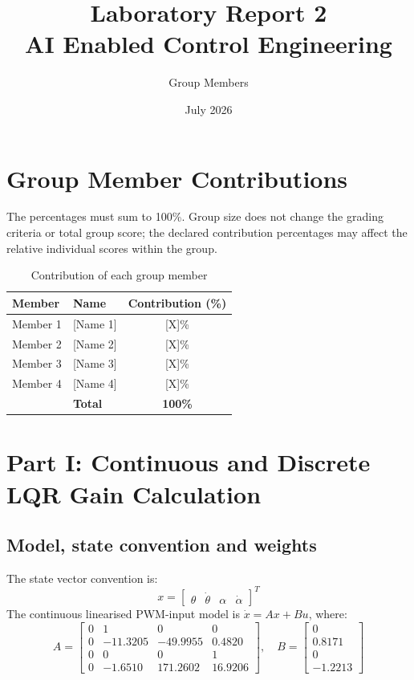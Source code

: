\documentclass[12pt,a4paper]{article}
\title{\textbf{Laboratory Report 2\\AI Enabled Control Engineering}}
\author{Group Members}
\date{July 2026}
\begin{document}
\maketitle

\section*{Group Member Contributions}
The percentages must sum to 100\%. Group size does not change the grading criteria or total group score; the declared contribution percentages may affect the relative individual scores within the group.

\begin{table}[h!]
    \centering
    \caption{Contribution of each group member}
    \begin{tabular}{llc}
        \toprule
        \textbf{Member} & \textbf{Name} & \textbf{Contribution (\%)} \\
        \midrule
        Member 1 & [Name 1] & [X]\% \\
        Member 2 & [Name 2] & [X]\% \\
        Member 3 & [Name 3] & [X]\% \\
        Member 4 & [Name 4] & [X]\% \\
        \midrule
        & \textbf{Total} & \textbf{100\%} \\
        \bottomrule
    \end{tabular}
\end{table}

\newpage
\tableofcontents
\newpage

\section{Part I: Continuous and Discrete LQR Gain Calculation}

\subsection{Model, state convention and weights}
The state vector convention is:
\begin{equation}
    x = \begin{bmatrix} \theta & \dot{\theta} & \alpha & \dot{\alpha} \end{bmatrix}^T
\end{equation}
The continuous linearised PWM-input model is $\dot{x} = Ax + Bu$, where:
\begin{equation}
    A = \begin{bmatrix} 
        0 & 1 & 0 & 0 \\ 
        0 & -11.3205 & -49.9955 & 0.4820 \\ 
        0 & 0 & 0 & 1 \\ 
        0 & -1.6510 & 171.2602 & 16.9206 
    \end{bmatrix}, \quad
    B = \begin{bmatrix} 
        0 \\ 0.8171 \\ 0 \\ -1.2213 
    \end{bmatrix}
\end{equation}
\end{document}
